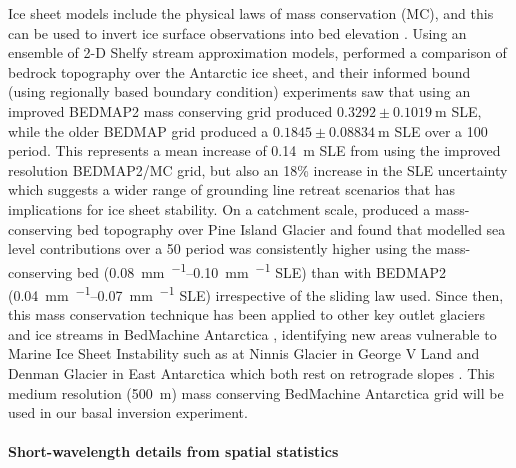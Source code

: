Ice sheet models include the physical laws of mass conservation (MC), and this can be used to invert ice surface observations into bed elevation \citep[e.g.][]{Morlighemmassconservationapproach2011}.
Using an ensemble of 2-D Shelfy stream approximation \citep[SSA;][]{MacAyealLargescaleiceflow1989} models, \citet{SchlegelExplorationAntarcticIce2018} performed a comparison of bedrock topography over the Antarctic ice sheet, and their informed bound (using regionally based boundary condition) experiments saw that using an improved BEDMAP2 mass conserving grid \citep[cf.][]{RignotWidespreadrapidgrounding2014} produced $0.3292\pm\SI{0.1019}{\metre}$ \gls{SLE}, while the older BEDMAP \citep{LytheBEDMAPnewice2001} grid produced a $0.1845\pm\SI{0.08834}{\metre}$ \gls{SLE} over a \SI{100}{\year} period.
This represents a mean increase of \SI{0.14}{m} \gls{SLE} from using the improved resolution BEDMAP2/MC grid, but also an 18\% increase in the \gls{SLE} uncertainty which suggests a wider range of grounding line retreat scenarios that has implications for ice sheet stability.
On a catchment scale, \citet{NiasNewMassConserving2018} produced a mass-conserving bed topography over Pine Island Glacier and found that modelled sea level contributions over a \SI{50}{\year} period was consistently higher using the mass-conserving bed (\SIrange{0.08}{0.10}{\milli\metre\per\year} \gls{SLE}) than with BEDMAP2 (\SIrange{0.04}{0.07}{\milli\metre\per\year} \gls{SLE}) irrespective of the sliding law used.
Since then, this mass conservation technique has been applied to other key outlet glaciers and ice streams in BedMachine Antarctica \citep{MorlighemMEaSUREsBedMachineAntarctica2020}, identifying new areas vulnerable to Marine Ice Sheet Instability such as at Ninnis Glacier in George V Land and Denman Glacier in East Antarctica which both rest on retrograde slopes \citep{MorlighemDeepglacialtroughs2019}.
This medium resolution (\SI{500}{\metre}) mass conserving BedMachine Antarctica grid \citep[version 2,][]{MorlighemMEaSUREsBedMachineAntarctica2020} will be used in our basal inversion experiment.

\paragraph{Short-wavelength details from spatial statistics}

